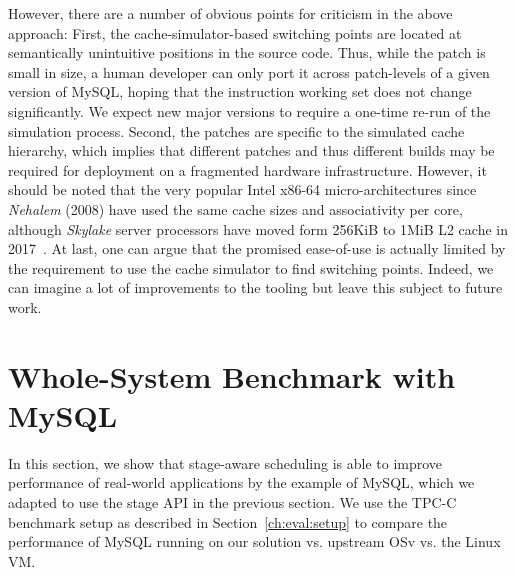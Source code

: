 \documentclass[12pt,a4paper]{book}
\begin{document}
However, there are a number of obvious points for criticism in the above approach:
First, the cache-simulator-based switching points are located at semantically unintuitive positions in the source code.
Thus, while the patch is small in size, a human developer can only port it across patch-levels of a given version of MySQL, hoping that the instruction working set does not change significantly.
We expect new major versions to require a one-time re-run of the simulation process.
Second, the patches are specific to the simulated cache hierarchy, which implies that different patches and thus different builds may be required for deployment on a fragmented hardware infrastructure.
However, it should be noted that the very popular Intel x86-64 micro-architectures since \emph{Nehalem} (2008) have used the same cache sizes and associativity per core, although \emph{Skylake} server processors have moved form 256KiB to 1MiB L2 cache in 2017~\cite{nehalemCacheHierarchy,skylakeServerCacheHierarchy}.
At last, one can argue that the promised ease-of-use is actually limited by the requirement to use the cache simulator to find switching points.
Indeed, we can imagine a lot of improvements to the tooling but leave this subject to future work.

\section{Whole-System Benchmark with MySQL}\label{ch:eval:perf}
In this section, we show that stage-aware scheduling is able to improve performance of real-world applications by the example of MySQL, which we adapted to use the stage API in the previous section.
We use the TPC-C benchmark setup as described in Section~\ref{ch:eval:setup} to compare the performance of MySQL running on our solution vs. upstream OSv vs. the Linux VM.
\end{document}
